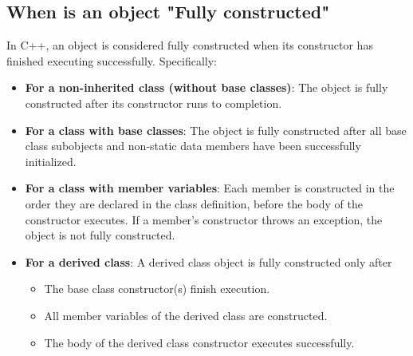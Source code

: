 \documentclass{report}
\begin{document}
    \subsection{ When is an object "Fully constructed"}
    \bigbreak \noindent 
    In C++, an object is considered fully constructed when its constructor has finished executing successfully. Specifically:
    \bigbreak \noindent 
    \begin{itemize}
        \item \textbf{For a non-inherited class (without base classes)}: The object is fully constructed after its constructor runs to completion.
        \item \textbf{For a class with base classes}: The object is fully constructed after all base class subobjects and non-static data members have been successfully initialized.
        \item \textbf{For a class with member variables}: Each member is constructed in the order they are declared in the class definition, before the body of the constructor executes. If a member's constructor throws an exception, the object is not fully constructed.
        \item \textbf{For a derived class}: A derived class object is fully constructed only after
            \begin{itemize}
                \item The base class constructor(s) finish execution.
                \item All member variables of the derived class are constructed.
                \item The body of the derived class constructor executes successfully.
            \end{itemize}
    \end{itemize}
    \bigbreak \noindent 
\end{document}
